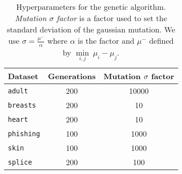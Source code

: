 
\begin{table}[h!]
\begin{center}
  \caption{Hyperparameters for the genetic algorithm. {\it Mutation $\sigma$ factor} is a factor used to set the standard deviation of the gaussian mutation. We use $\sigma = \frac{\mu^-}{\alpha}$ where $\alpha$ is the factor and $\mu^-$ defined by $\underset{i,j}{\min}{~ \mu_i - \mu_j}$.}
  \begin{small}
\begin{tabular}{|l|c|c|}
\hline
  Dataset & Generations & Mutation $\sigma$ factor \\ \hline
 \texttt{adult} & 200 & 10000 \\
  \texttt{breasts} & 200 & 10 \\
  \texttt{heart} & 200 & 10 \\
    \texttt{phishing} & 100 & 1000 \\
    \texttt{skin} & 100 & 1000 \\
    \texttt{splice} & 200 & 100 \\\hline
\end{tabular}
\end{small}
  \label{table:hyperparameters_ga}
\end{center}
\end{table}